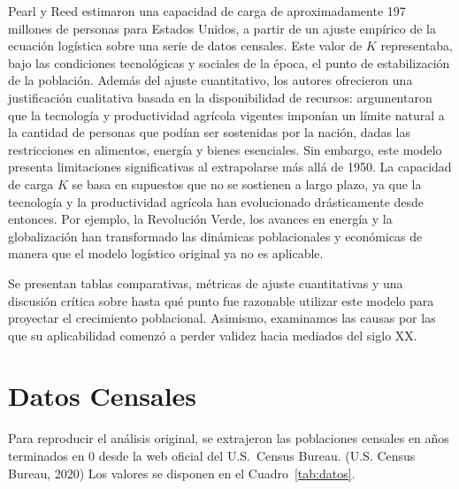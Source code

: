 \documentclass[12pt]{article}
\begin{document}
Pearl y Reed estimaron una capacidad de carga de aproximadamente 197 millones de personas para Estados Unidos, a partir de un ajuste empírico de la ecuación logística sobre una serie de datos censales. Este valor de $K$ representaba, bajo las condiciones tecnológicas y sociales de la época, el punto de estabilización de la población. Además del ajuste cuantitativo, los autores ofrecieron una justificación cualitativa basada en la disponibilidad de recursos: argumentaron que la tecnología y productividad agrícola vigentes imponían un límite natural a la cantidad de personas que podían ser sostenidas por la nación, dadas las restricciones en alimentos, energía y bienes esenciales.
Sin embargo, este modelo presenta limitaciones significativas al extrapolarse más allá de 1950. La capacidad de carga $K$ se basa en supuestos que no se sostienen a largo plazo, ya que la tecnología y la productividad agrícola han evolucionado drásticamente desde entonces. Por ejemplo, la Revolución Verde, los avances en energía y la globalización han transformado las dinámicas poblacionales y económicas de manera que el modelo logístico original ya no es aplicable.

Se presentan tablas comparativas, métricas de ajuste cuantitativas y una discusión crítica sobre hasta qué punto fue razonable utilizar este modelo para proyectar el crecimiento poblacional. Asimismo, examinamos las causas por las que su aplicabilidad comenzó a perder validez hacia mediados del siglo XX.



\section{Datos Censales}  %
Para reproducir el análisis original, se extrajeron las poblaciones
censales en años terminados en 0 desde la web oficial del U.S.\ Census Bureau. (U.S. Census Bureau, 2020)
Los valores se disponen en el Cuadro~\ref{tab:datos}.
\end{document}
